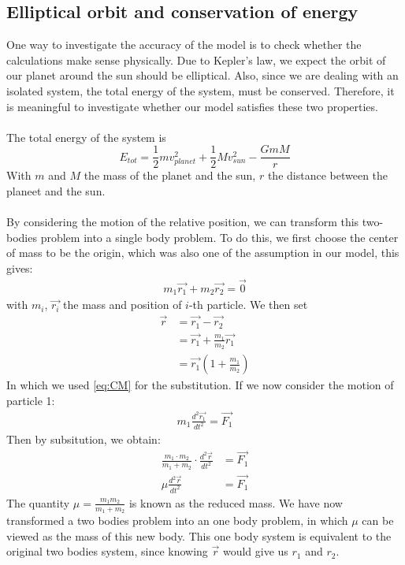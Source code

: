 \subsection{Elliptical orbit and conservation of energy}
One way to investigate the accuracy of the model is to check whether the calculations make sense physically. Due to Kepler's law, we expect the orbit of our planet around the sun should be elliptical. 
Also, since we are dealing with an isolated system, the total energy of the system, must be conserved. 
Therefore, it is meaningful to investigate whether our model satisfies these two properties.\\ 
\\
The total energy of the system is \cite{Energy}
\[E_{tot}=\frac{1}{2}mv_{planet}^2+\frac{1}{2}Mv_{sun}^2-\frac{GmM}{r}\]
With $m$ and $M$ the mass of the planet and the sun, $r$ the distance between the planeet and the sun.\\
\\
By considering the motion of the relative position, we can transform this two-bodies problem into a single body problem\cite{reducedmass}. To do this, we first choose the center of mass to be the origin, which was also one of the assumption in our model, this gives:
\begin{align}
m_1\vec{r_1}+m_2\vec{r_2}=\vec{0}\label{eq:CM} 
\end{align}
with $m_i$, $\vec{r_i}$ the mass and position of $i$-th particle. We then set
\begin{align*}
\vec{r}&=\vec{r_1}-\vec{r_2}\\ 
	   &=\vec{r_1}+\frac{m_1}{m_2}\vec{r_1}\\
	   &=\vec{r_1}(1+\frac{m_1}{m_2}) 
\end{align*}
In which we used \ref{eq:CM} for the substitution. If we now consider the motion of particle 1:
\begin{align*}
m_1\frac{d^2\vec{r_1}}{dt^2}=\vec{F_1}
\end{align*}
Then by subsitution, we obtain:
\begin{align*}
\frac{m_1\cdot m_2}{m_1+m_2}\cdot\frac{d^2 \vec{r}}{dt^2}&=\vec{F_1}\\
\mu\frac{d^2 \vec{r}}{dt^2}&=\vec{F_1}
\end{align*}
The quantity $\mu=\frac{m_1m_2}{m_1+m_2}$ is known as the reduced mass. We have now transformed a two bodies problem into an one body problem, in which $\mu$ can be viewed as the mass of this new body. This one body system is equivalent to the original two bodies system, since knowing $\vec{r}$ would give us $r_1$ and $r_2$. \\
